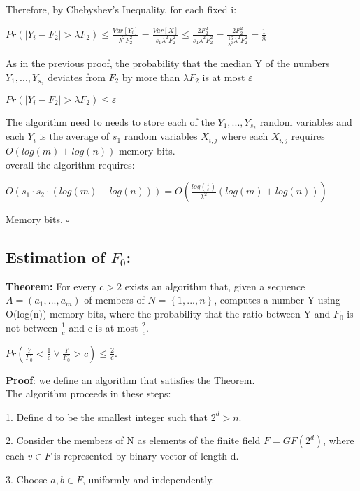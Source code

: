 \documentclass{article}
\begin{document}
Therefore, by Chebyshev’s Inequality, for each fixed i:
\begin{center}
    \(Pr(|Y_i - F_2| > \lambda F_2) \leq \frac{Var[Y_i]}{\lambda^2 F_2^2} =
    \frac{Var[X]}{s_1 \lambda^2 F_2^2} \leq
    \frac{2F_2^2}{s_1 \lambda^2 F_2^2} = 
    \frac{2F_2^2}{\frac{16}{\lambda^{2}} \lambda^2 F_2^2}
     = \frac{1}{8}\)
\end{center}
As in the previous proof, the probability that the median Y of the numbers \(Y_1, ...,Y_{s_2}\) deviates from \(F_2\) by more than \(\lambda F_2\) is at most \(\varepsilon\)
\begin{center}
    \(Pr(|Y_i - F_2| > \lambda F_2) \leq \varepsilon\)
\end{center}
The algorithm need to needs to store each of the \(Y_1, ..., Y_{s_2}\) random variables and each \(Y_i\) is the average of \(s_1\) random variables \(X_{i,j}\) where each \(X_{i,j}\) requires \(O(log(m) + log(n))\) memory bits.\\
overall the algorithm requires:
\begin{center}
    \(O(s_1 \cdot s_2 \cdot(log(m) + log(n))) = O(\frac{log(\frac{1}{\varepsilon})}{\lambda^2} (log(m) + log(n)))\)
\end{center}
Memory bits. $\square$


\subsection{Estimation of \(F_{0}\):}
\textbf{Theorem:} For every \(c > 2\) exists an algorithm that, given a sequence \(A = (a_1, ..., a_m)\) of members of \(N = \left\{1, ..., n\right\}\), computes a number Y using O(log(n)) memory bits, where the probability that the ratio between Y and $F_0$ is not between \(\frac{1}{c}\) and c is at most \(\frac{2}{c}\).
\begin{center}
    \(Pr(\frac{Y}{F_0} < \frac{1}{c} \vee \frac{Y}{F_0} > c ) \leq \frac{2}{c}\).
\end{center}

\textbf{Proof}: we define an algorithm that satisfies the Theorem.\\
The algorithm proceeds in these steps:

1. Define d to be the smallest integer such that \(2^d > n\).

2. Consider the members of N as elements of the finite field \(F = GF(2^d)\), where each \(v \in F\) is represented by binary vector of length d.

3. Choose \(a, b \in F\), uniformly and independently.
\end{document}
